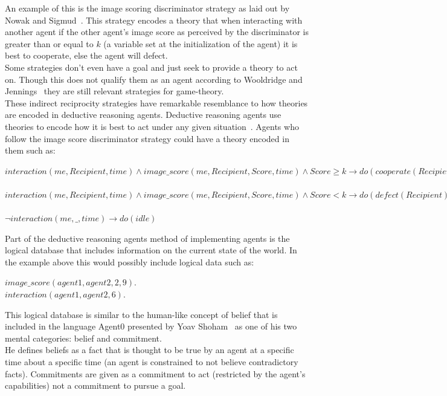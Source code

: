 \documentclass[twoside,twocolumn]{article}
\begin{document}
An example of this is the image scoring discriminator strategy as laid out by Nowak and Sigmud~\cite{evol_indirect_image}. This strategy encodes a theory that when interacting with another agent if the other agent's image score as perceived by the discriminator is greater than or equal to $k$ (a variable set at the initialization of the agent) it is best to cooperate, else the agent will defect.\\
Some strategies don't even have a goal and just seek to provide a theory to act on. Though this does not qualify them as an agent according to Wooldridge and Jennings~\cite{wooldridge_jennings_1995} they are still relevant strategies for game-theory.\\
These indirect reciprocity strategies have remarkable resemblance to how theories are encoded in deductive reasoning agents. Deductive reasoning agents use theories to encode how it is best to act under any given situation~\cite{kostas_deductive}. Agents who follow the image score discriminator strategy could have a theory encoded in them such as:
\begin{framed}
\noindent$interaction(me, Recipient, time) \wedge image\_score(me, Recipient, Score, time) \wedge Score\geq k \to do(cooperate(Recipient))$\\\\
$interaction(me, Recipient, time) \wedge image\_score(me, Recipient, Score, time) \wedge Score<k \to do(defect(Recipient))$\\\\
$\neg interaction(me, \_, time) \to do(idle)$
\end{framed}
\noindent Part of the deductive reasoning agents method of implementing agents is the logical database that includes information on the current state of the world. In the example above this would possibly include logical data such as:
\begin{framed}
\begin{center}
$image\_score(agent1, agent2, 2, 9).$ \\
$interaction(agent1, agent2, 6).$
\end{center}
\end{framed}
\noindent This logical database is similar to the human-like concept of belief that is included in the language Agent0 presented by Yoav Shoham~\cite{shoham1991agent0} as one of his two mental categories: belief and commitment.\\
He defines beliefs as a fact that is thought to be true by an agent at a specific time about a specific time (an agent is constrained to not believe contradictory facts). Commitments are given as a commitment to act (restricted by the agent's capabilities) not a commitment to pursue a goal.\\
\end{document}
